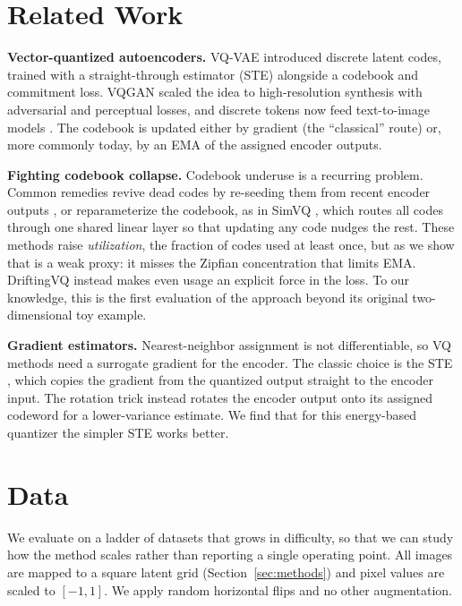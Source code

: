 \documentclass[10pt,twocolumn,letterpaper]{article}
\begin{document}
\section{Related Work}

\noindent\textbf{Vector-quantized autoencoders.} VQ-VAE \cite{vqvae} introduced
discrete latent codes, trained with a straight-through estimator (STE) alongside a
codebook and commitment loss. VQGAN \cite{vqgan} scaled the idea to high-resolution
synthesis with adversarial and perceptual losses, and discrete tokens now feed
text-to-image models \cite{dalle}. The codebook is updated either by gradient (the
``classical'' route) or, more commonly today, by an EMA of the assigned encoder
outputs.

\noindent\textbf{Fighting codebook collapse.} Codebook underuse is a recurring
problem. Common remedies revive dead codes by re-seeding them from recent encoder
outputs \cite{reservoir}, or reparameterize the codebook, as in SimVQ \cite{simvq},
which routes all codes through one shared linear layer so that updating any code
nudges the rest. These methods raise \emph{utilization}, the fraction of codes used at
least once, but as we show that is a weak proxy: it misses the Zipfian concentration
that limits EMA. DriftingVQ \cite{liu2026drift} instead makes even usage an explicit
force in the loss. To our knowledge, this is the first evaluation of the approach
beyond its original two-dimensional toy example.

\noindent\textbf{Gradient estimators.} Nearest-neighbor assignment is not
differentiable, so VQ methods need a surrogate gradient for the encoder. The classic
choice is the STE \cite{vqvae}, which copies the gradient from the quantized output
straight to the encoder input. The rotation trick \cite{rotationtrick} instead rotates
the encoder output onto its assigned codeword for a lower-variance estimate. We find
that for this energy-based quantizer the simpler STE works better.

\section{Data}

We evaluate on a ladder of datasets that grows in difficulty, so that we can study
how the method scales rather than reporting a single operating point. All images
are mapped to a square latent grid (Section~\ref{sec:methods}) and pixel values are
scaled to $[-1,1]$. We apply random horizontal flips and no other augmentation.
\end{document}
